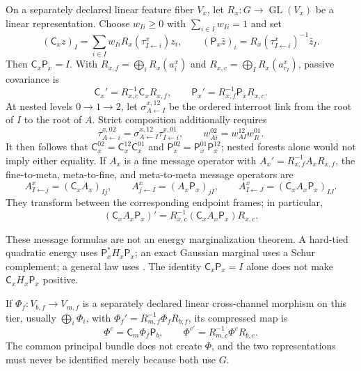 On a separately declared linear feature fiber $V_x$, let
$R_x:G\to\operatorname{GL}(V_x)$ be a linear representation.  Choose
$w_{Ii}\geq0$ with $\sum_{i\in I}w_{Ii}=1$ and set
\begin{equation}
(\mathsf C_xz)_I
=\sum_{i\in I}w_{Ii}R_x(\tau^x_{I\leftarrow i})z_i,
\qquad
(\mathsf P_x\bar z)_i
=R_x(\tau^x_{I\leftarrow i})^{-1}\bar z_I.
\label{eq:rg-linear-cross-scale-maps}
\end{equation}
Then $\mathsf C_x\mathsf P_x=I$.  With
$R_{x,f}=\bigoplus_iR_x(a_i^x)$ and
$R_{x,c}=\bigoplus_IR_x(a_{r_I}^x)$, passive covariance is
\begin{equation}
\mathsf C_x'=R_{x,c}^{-1}\mathsf C_xR_{x,f},
\qquad
\mathsf P_x'=R_{x,f}^{-1}\mathsf P_xR_{x,c}.
\label{eq:rg-linear-cross-scale-covariance}
\end{equation}
At nested levels $0\to1\to2$, let
$\sigma^{x,12}_{A\leftarrow I}$ be the ordered interroot link from the root
of $I$ to the root of $A$.  Strict composition additionally requires
\begin{equation}
\tau^{x,02}_{A\leftarrow i}
=\sigma^{x,12}_{A\leftarrow I}\tau^{x,01}_{I\leftarrow i},
\qquad
w^{02}_{Ai}=w^{12}_{AI}w^{01}_{Ii}.
\label{eq:rg-linear-nested-compatibility}
\end{equation}
It then follows that
$\mathsf C_x^{02}=\mathsf C_x^{12}\mathsf C_x^{01}$ and
$\mathsf P_x^{02}=\mathsf P_x^{01}\mathsf P_x^{12}$; nested forests alone
would not imply either equality.  If $A_x$ is a fine message operator with
$A_x'=R_{x,f}^{-1}A_xR_{x,f}$, the
fine-to-meta, meta-to-fine, and meta-to-meta message operators are
\begin{equation}
A^x_{I\leftarrow j}=(\mathsf C_xA_x)_{Ij},
\qquad
A^x_{j\leftarrow I}=(A_x\mathsf P_x)_{jI},
\qquad
A^x_{I\leftarrow J}=(\mathsf C_xA_x\mathsf P_x)_{IJ}.
\label{eq:rg-cross-scale-message-operators}
\end{equation}
They transform between the corresponding endpoint frames; in particular,
\[
(\mathsf C_xA_x\mathsf P_x)'
=R_{x,c}^{-1}(\mathsf C_xA_x\mathsf P_x)R_{x,c}.
\]

These message formulas are not an energy marginalization theorem.  A hard-tied
quadratic energy uses $\mathsf P_x^*H_x\mathsf P_x$; an exact Gaussian marginal
uses a Schur complement; a general law uses
.  The identity
$\mathsf C_x\mathsf P_x=I$ alone does not make
$\mathsf C_xH_x\mathsf P_x$ positive.  

If $\Phi_f:V_{b,f}\to V_{m,f}$ is a separately declared linear
cross-channel morphism on this tier, usually $\bigoplus_i\Phi_i$, with
$\Phi_f'=R_{m,f}^{-1}\Phi_fR_{b,f}$, its compressed map is
\begin{equation}
\Phi^c=\mathsf C_m\Phi_f\mathsf P_b,
\qquad
\Phi^{c\prime}=R_{m,c}^{-1}\Phi^cR_{b,c}.
\label{eq:rg-coarse-cross-channel-map}
\end{equation}
The common principal bundle does not create $\Phi$, and the two representations
must never be identified merely because both use $G$.  

